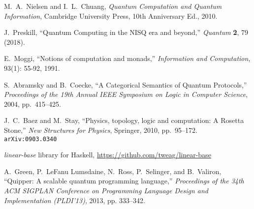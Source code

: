 \documentclass[12pt]{article}
\begin{document}

\begin{thebibliography}{99}

M.~A.~Nielsen and I.~L.~Chuang,
\textit{Quantum Computation and Quantum Information},
Cambridge University Press, 10th Anniversary Ed., 2010.

J.~Preskill,
``Quantum Computing in the NISQ era and beyond,''
\emph{Quantum} \textbf{2}, 79 (2018).

E.~Moggi,
``Notions of computation and monads,''
\emph{Information and Computation}, 93(1): 55-92, 1991.

S.~Abramsky and B.~Coecke,
``A Categorical Semantics of Quantum Protocols,''
\emph{Proceedings of the 19th Annual IEEE Symposium on Logic in Computer Science}, 2004, pp.~415--425.

J.~C.~Baez and M.~Stay,
``Physics, topology, logic and computation: A Rosetta Stone,''
\textit{New Structures for Physics}, Springer, 2010, pp.~95--172.
\texttt{arXiv:0903.0340}

\emph{linear-base} library for Haskell, \url{https://github.com/tweag/linear-base}

A.~Green, P.~LeFanu Lumsdaine, N.~Ross, P.~Selinger, and B.~Valiron,
``Quipper: A scalable quantum programming language,''
\textit{Proceedings of the 34th ACM SIGPLAN Conference on Programming Language Design and Implementation (PLDI'13)}, 2013, pp. 333--342.

\end{thebibliography}
\end{document}
